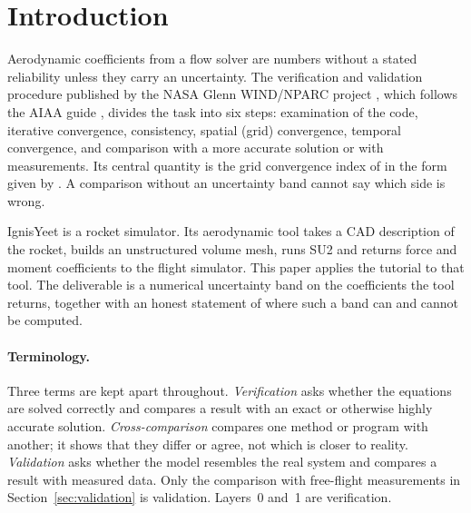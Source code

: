 \documentclass[11pt,a4paper]{article}
\begin{document}
\begin{abstract}
The validation comparison therefore has no RANS band, and whether the numerical and measurement bands overlap cannot be judged.
For the one condition with a usable GCI, a lower bound of the iterative error is $3\times10^{-5}$ of it; no matched row has an iterative-error to GCI ratio above 1.
None of the seven Euler-against-RANS conditions can be given a verdict, because one or both sides lack a usable GCI.
On a turbulent flat plate run in SU2 directly, the Menter SST model differs from Spalart--Allmaras by $-0.79\,\%$ in skin friction, which is within the SST GCI of
1.14\,\% (the Spalart--Allmaras GCI is flagged), and by $-0.46\,\%$ in drag, which is not separable from the grid uncertainty.
\end{abstract}

\section{Introduction}
\label{sec:intro}

Aerodynamic coefficients from a flow solver are numbers without a stated reliability unless they carry
an uncertainty.
The verification and validation procedure published by the NASA Glenn WIND/NPARC project
\citep{nparc_tutorial}, which follows the AIAA guide \citep{aiaa1998}, divides the task into six steps:
examination of the code, iterative convergence, consistency, spatial (grid) convergence, temporal convergence,
and comparison with a more accurate solution or with measurements.
Its central quantity is the grid convergence index of \citet{roache1998} in the form given by
\citet{celik2008}.
A comparison without an uncertainty band cannot say which side is wrong.

IgnisYeet is a rocket simulator.
Its aerodynamic tool takes a CAD description of the rocket, builds an unstructured volume mesh, runs SU2
\citep{economon2016} and returns force and moment coefficients to the flight simulator.
This paper applies the tutorial to that tool.
The deliverable is a numerical uncertainty band on the coefficients the tool returns, together with
an honest statement of where such a band can and cannot be computed.

\paragraph{Terminology.}
Three terms are kept apart throughout.
\emph{Verification} asks whether the equations are solved correctly and compares a result with an exact or
otherwise highly accurate solution.
\emph{Cross-comparison} compares one method or program with another; it shows that they differ or agree,
not which is closer to reality.
\emph{Validation} asks whether the model resembles the real system and compares a result with measured data.
Only the comparison with free-flight measurements in Section~\ref{sec:validation} is validation.
Layers~0 and~1 are verification.
\end{document}
